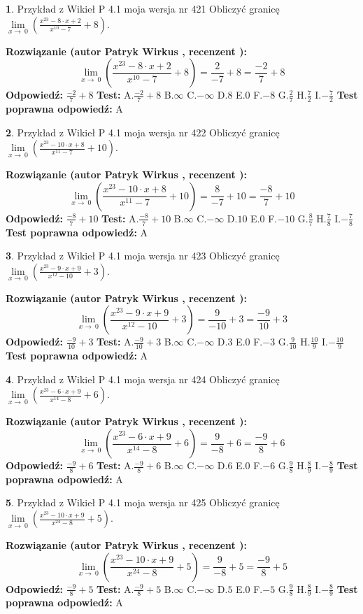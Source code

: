 \documentclass[12pt, a4paper]{article}
\theoremstyle{definition} %
\newtheorem{zad}{}
\newcommand{\zadStart}[1]{\begin{zad}#1\newline}
\newcommand{\zadStop}{\end{zad}}
\newcommand{\rozwStart}[2]{\noindent \textbf{Rozwiązanie (autor #1 , recenzent #2): }\newline}
\newcommand{\rozwStop}{\newline}
\newcommand{\odpStart}{\noindent \textbf{Odpowiedź:}\newline}
\newcommand{\odpStop}{\newline}
\newcommand{\testStart}{\noindent \textbf{Test:}\newline}
\newcommand{\testStop}{\newline}
\newcommand{\kluczStart}{\noindent \textbf{Test poprawna odpowiedź:}\newline}
\newcommand{\kluczStop}{\newline}
\begin{document}
\zadStart{Przykład z Wikieł P 4.1 moja wersja nr 421}
Obliczyć granicę $\lim\limits_{x\to\ 0}(\frac{x^{23}-8 \cdot x +2}{x^{10}-7}+8)$.
\zadStop
\rozwStart{Patryk Wirkus}{}
$$\lim\limits_{x\to\ 0}(\frac{x^{23}-8 \cdot x +2}{x^{10}-7}+8)=\frac{2}{-7}+8=\frac{-2}{7}+8$$
\rozwStop
\odpStart
$\frac{-2}{7}+8$
\odpStop
\testStart
A.$\frac{-2}{7}+8$
B.$\infty$
C.$-\infty$
D.$8$
E.$0$
F.$-8$
G.$\frac{2}{7}$
H.$\frac{7}{2}$
I.$-\frac{7}{2}$
\testStop
\kluczStart
A
\kluczStop



\zadStart{Przykład z Wikieł P 4.1 moja wersja nr 422}
Obliczyć granicę $\lim\limits_{x\to\ 0}(\frac{x^{23}-10 \cdot x +8}{x^{11}-7}+10)$.
\zadStop
\rozwStart{Patryk Wirkus}{}
$$\lim\limits_{x\to\ 0}(\frac{x^{23}-10 \cdot x +8}{x^{11}-7}+10)=\frac{8}{-7}+10=\frac{-8}{7}+10$$
\rozwStop
\odpStart
$\frac{-8}{7}+10$
\odpStop
\testStart
A.$\frac{-8}{7}+10$
B.$\infty$
C.$-\infty$
D.$10$
E.$0$
F.$-10$
G.$\frac{8}{7}$
H.$\frac{7}{8}$
I.$-\frac{7}{8}$
\testStop
\kluczStart
A
\kluczStop



\zadStart{Przykład z Wikieł P 4.1 moja wersja nr 423}
Obliczyć granicę $\lim\limits_{x\to\ 0}(\frac{x^{23}-9 \cdot x +9}{x^{12}-10}+3)$.
\zadStop
\rozwStart{Patryk Wirkus}{}
$$\lim\limits_{x\to\ 0}(\frac{x^{23}-9 \cdot x +9}{x^{12}-10}+3)=\frac{9}{-10}+3=\frac{-9}{10}+3$$
\rozwStop
\odpStart
$\frac{-9}{10}+3$
\odpStop
\testStart
A.$\frac{-9}{10}+3$
B.$\infty$
C.$-\infty$
D.$3$
E.$0$
F.$-3$
G.$\frac{9}{10}$
H.$\frac{10}{9}$
I.$-\frac{10}{9}$
\testStop
\kluczStart
A
\kluczStop



\zadStart{Przykład z Wikieł P 4.1 moja wersja nr 424}
Obliczyć granicę $\lim\limits_{x\to\ 0}(\frac{x^{23}-6 \cdot x +9}{x^{14}-8}+6)$.
\zadStop
\rozwStart{Patryk Wirkus}{}
$$\lim\limits_{x\to\ 0}(\frac{x^{23}-6 \cdot x +9}{x^{14}-8}+6)=\frac{9}{-8}+6=\frac{-9}{8}+6$$
\rozwStop
\odpStart
$\frac{-9}{8}+6$
\odpStop
\testStart
A.$\frac{-9}{8}+6$
B.$\infty$
C.$-\infty$
D.$6$
E.$0$
F.$-6$
G.$\frac{9}{8}$
H.$\frac{8}{9}$
I.$-\frac{8}{9}$
\testStop
\kluczStart
A
\kluczStop



\zadStart{Przykład z Wikieł P 4.1 moja wersja nr 425}
Obliczyć granicę $\lim\limits_{x\to\ 0}(\frac{x^{23}-10 \cdot x +9}{x^{24}-8}+5)$.
\zadStop
\rozwStart{Patryk Wirkus}{}
$$\lim\limits_{x\to\ 0}(\frac{x^{23}-10 \cdot x +9}{x^{24}-8}+5)=\frac{9}{-8}+5=\frac{-9}{8}+5$$
\rozwStop
\odpStart
$\frac{-9}{8}+5$
\odpStop
\testStart
A.$\frac{-9}{8}+5$
B.$\infty$
C.$-\infty$
D.$5$
E.$0$
F.$-5$
G.$\frac{9}{8}$
H.$\frac{8}{9}$
I.$-\frac{8}{9}$
\testStop
\kluczStart
A
\kluczStop
\end{document}
